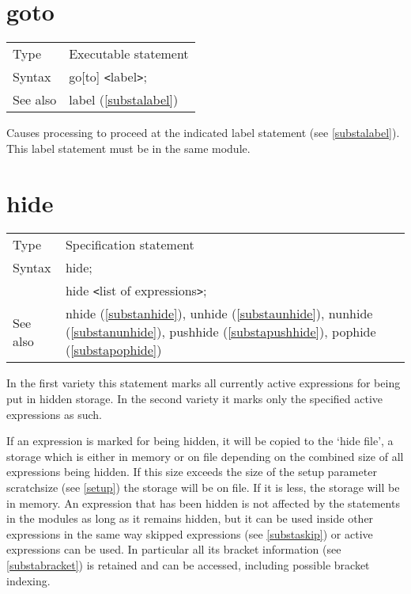 \section{goto}
\label{substagoto}

\noindent \begin{tabular}{ll}
Type & Executable statement\\
Syntax & go[to] {\tt<}label{\tt>}; \\
See also & label (\ref{substalabel})
\end{tabular} \vspace{4mm}

\noindent Causes processing to proceed at the indicated 
label statement 
(see \ref{substalabel}). This label statement must be in the same module. 
\vspace{10mm}


\section{hide}
\label{substahide}

\noindent \begin{tabular}{ll}
Type & Specification statement\\
Syntax & hide; \\
       & hide {\tt<}list of expressions{\tt>};
\\ See also & nhide (\ref{substanhide}),
              unhide (\ref{substaunhide}),
              nunhide (\ref{substanunhide}),
              pushhide (\ref{substapushhide}),
              pophide (\ref{substapophide})
\end{tabular} \vspace{4mm}

\noindent In the first variety this statement marks all currently active 
expressions for being put in hidden storage. In the second variety it marks 
only the specified active expressions as such. \vspace{4mm}

\noindent If an expression is marked for being hidden, it will be copied to 
the `hide file', a storage which is 
either in memory or on file depending on the combined size of all 
expressions being hidden. If this size exceeds the size of the setup 
parameter scratchsize (see \ref{setup}) the storage will 
be on file. If it is less, the storage will be in memory. An expression 
that has been hidden is not affected by the statements in the modules as 
long as it remains hidden, but it can be used inside other expressions in 
the same way skipped expressions (see 
\ref{substaskip}) or active expressions can be used. In particular all its 
bracket information (see \ref{substabracket}) is retained 
and can be accessed, including possible bracket 
indexing. \vspace{4mm}

